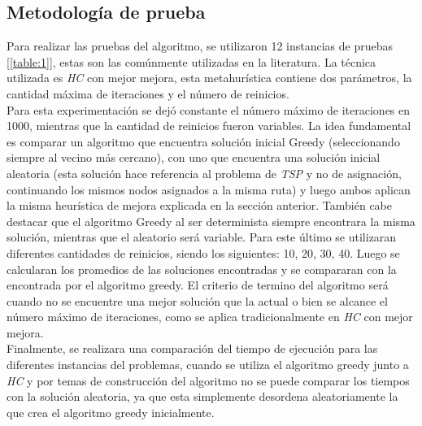 \documentclass[letter, 10pt]{article}
\begin{document}
\subsection{Metodología de prueba}

Para realizar las pruebas del algoritmo, se utilizaron 12 instancias de pruebas [\ref{table:1}], estas son las comúnmente utilizadas en la literatura. La técnica utilizada es \textit{HC} con mejor mejora, esta metahurística contiene dos parámetros, la cantidad máxima de iteraciones y el número de reinicios. \\Para esta experimentación se dejó constante el número máximo de iteraciones en 1000, mientras que la cantidad de reinicios fueron variables. La idea fundamental es comparar un algoritmo que encuentra solución inicial Greedy (seleccionando siempre al vecino más cercano), con uno que encuentra una solución inicial aleatoria (esta solución hace referencia al problema de \textit{TSP} y no de asignación, continuando los mismos nodos asignados a la misma ruta) y luego ambos aplican la misma heurística de mejora explicada en la sección anterior. También cabe destacar que el algoritmo Greedy al ser determinista siempre encontrara la misma solución, mientras que el aleatorio será variable.  Para este último se utilizaran diferentes cantidades de reinicios, siendo los siguientes: 10, 20, 30, 40. Luego se calcularan los promedios de las soluciones encontradas y se compararan con la encontrada por el algoritmo greedy.
El criterio de termino del algoritmo será cuando no se encuentre una mejor solución que la actual o bien se alcance el número máximo de iteraciones, como se aplica tradicionalmente en \textit{HC} con mejor mejora.\\
Finalmente, se realizara una comparación del tiempo de ejecución para las diferentes instancias del problemas, cuando se utiliza el algoritmo greedy junto a \textit{HC} y por temas de construcción del algoritmo no se puede comparar los tiempos con la solución aleatoria, ya que esta simplemente desordena aleatoriamente la que crea el algoritmo greedy inicialmente.
\\
\end{document}
